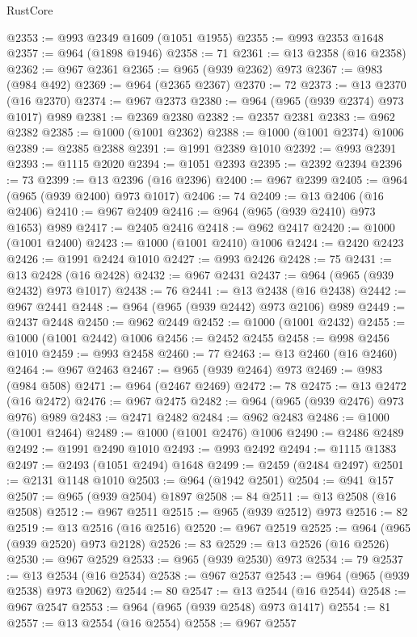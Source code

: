 \begin{lexlean}{RustCore}
\begin{coremodule}
@2353 := @993 @2349 @1609 (@1051 @1955)
@2355 := @993 @2353 @1648
@2357 := @964 (@1898 @1946)
@2358 := 71
@2361 := @13 @2358 (@16 @2358)
@2362 := @967 @2361
@2365 := @965 (@939 @2362) @973
@2367 := @983 (@984 @492)
@2369 := @964 (@2365 @2367)
@2370 := 72
@2373 := @13 @2370 (@16 @2370)
@2374 := @967 @2373
@2380 := @964 (@965 (@939 @2374) @973 @1017) @989
@2381 := @2369 @2380
@2382 := @2357 @2381
@2383 := @962 @2382
@2385 := @1000 (@1001 @2362)
@2388 := @1000 (@1001 @2374) @1006
@2389 := @2385 @2388
@2391 := @1991 @2389 @1010
@2392 := @993 @2391
@2393 := @1115 @2020
@2394 := @1051 @2393
@2395 := @2392 @2394
@2396 := 73
@2399 := @13 @2396 (@16 @2396)
@2400 := @967 @2399
@2405 := @964 (@965 (@939 @2400) @973 @1017)
@2406 := 74
@2409 := @13 @2406 (@16 @2406)
@2410 := @967 @2409
@2416 := @964 (@965 (@939 @2410) @973 @1653) @989
@2417 := @2405 @2416
@2418 := @962 @2417
@2420 := @1000 (@1001 @2400)
@2423 := @1000 (@1001 @2410) @1006
@2424 := @2420 @2423
@2426 := @1991 @2424 @1010
@2427 := @993 @2426
@2428 := 75
@2431 := @13 @2428 (@16 @2428)
@2432 := @967 @2431
@2437 := @964 (@965 (@939 @2432) @973 @1017)
@2438 := 76
@2441 := @13 @2438 (@16 @2438)
@2442 := @967 @2441
@2448 := @964 (@965 (@939 @2442) @973 @2106) @989
@2449 := @2437 @2448
@2450 := @962 @2449
@2452 := @1000 (@1001 @2432)
@2455 := @1000 (@1001 @2442) @1006
@2456 := @2452 @2455
@2458 := @998 @2456 @1010
@2459 := @993 @2458
@2460 := 77
@2463 := @13 @2460 (@16 @2460)
@2464 := @967 @2463
@2467 := @965 (@939 @2464) @973
@2469 := @983 (@984 @508)
@2471 := @964 (@2467 @2469)
@2472 := 78
@2475 := @13 @2472 (@16 @2472)
@2476 := @967 @2475
@2482 := @964 (@965 (@939 @2476) @973 @976) @989
@2483 := @2471 @2482
@2484 := @962 @2483
@2486 := @1000 (@1001 @2464)
@2489 := @1000 (@1001 @2476) @1006
@2490 := @2486 @2489
@2492 := @1991 @2490 @1010
@2493 := @993 @2492
@2494 := @1115 @1383
@2497 := @2493 (@1051 @2494) @1648
@2499 := @2459 (@2484 @2497)
@2501 := @2131 @1148 @1010
@2503 := @964 (@1942 @2501)
@2504 := @941 @157
@2507 := @965 (@939 @2504) @1897
@2508 := 84
@2511 := @13 @2508 (@16 @2508)
@2512 := @967 @2511
@2515 := @965 (@939 @2512) @973
@2516 := 82
@2519 := @13 @2516 (@16 @2516)
@2520 := @967 @2519
@2525 := @964 (@965 (@939 @2520) @973 @2128)
@2526 := 83
@2529 := @13 @2526 (@16 @2526)
@2530 := @967 @2529
@2533 := @965 (@939 @2530) @973
@2534 := 79
@2537 := @13 @2534 (@16 @2534)
@2538 := @967 @2537
@2543 := @964 (@965 (@939 @2538) @973 @2062)
@2544 := 80
@2547 := @13 @2544 (@16 @2544)
@2548 := @967 @2547
@2553 := @964 (@965 (@939 @2548) @973 @1417)
@2554 := 81
@2557 := @13 @2554 (@16 @2554)
@2558 := @967 @2557

\end{coremodule}
\end{lexlean}

